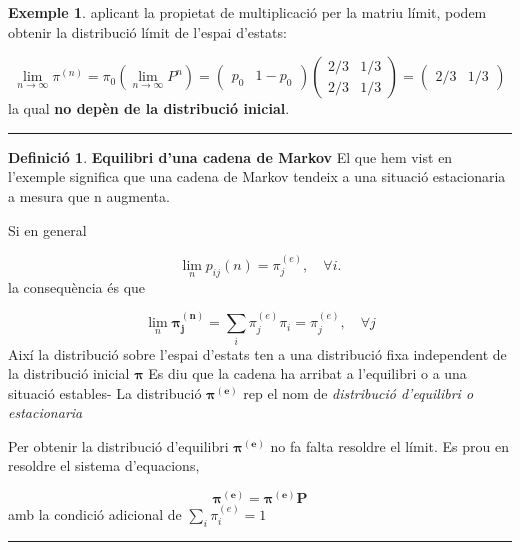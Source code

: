 \documentclass[
  catalan,
]{article}
\theoremstyle{definition}
\newtheorem{definition}{Definició}[section]
\theoremstyle{definition}
\newtheorem{example}{Exemple}[section]
\theoremstyle{definition}
\theoremstyle{definition}
\theoremstyle{remark}
\begin{document}
\begin{example}
aplicant la propietat de multiplicació per la matriu límit, podem obtenir la distribució límit de l'espai d'estats:

\[\lim_{n \to \infty} \pi^{(n)} = \pi_0 \left( \lim_{n \to \infty} P^n \right) = \begin{pmatrix} p_0 & 1 - p_0 \end{pmatrix} \begin{pmatrix} 2/3 & 1/3 \\ 2/3 & 1/3 \end{pmatrix} = \begin{pmatrix} 2/3 & 1/3 \end{pmatrix}\]
la qual \textbf{no depèn de la distribució inicial}.
\end{example}

\begin{center}\rule{0.5\linewidth}{0.5pt}\end{center}

\begin{definition}
\textbf{Equilibri d'una cadena de Markov}
El que hem vist en l'exemple significa que una cadena de Markov tendeix a una situació estacionaria a mesura que n augmenta.

Si en general

\[
\lim_n p_{ij}(n)=\pi_j^(e), \quad \forall i.
\]
la consequència és que

\[
\lim_n \boldsymbol{\pi_j^{(n)}} =\sum_i  \pi_j^(e) \pi_i=\pi_j^(e), \quad \forall j
\]
Així la distribució sobre l'espai d'estats ten a una distribució fixa independent de la distribució inicial \(\boldsymbol{\pi}\) Es diu que la cadena ha arribat a l'equilibri o a una situació estables- La distribució \(\boldsymbol{\pi^{(e)}}\) rep el nom de \emph{distribució d'equilibri o estacionaria}

Per obtenir la distribució d'equilibri \(\boldsymbol{\pi^{(e)}}\) no fa falta resoldre el límit. Es prou en resoldre el sistema d'equacions,

\[
\boldsymbol{\pi^{(e)}}=\boldsymbol{\pi^{(e)}} \boldsymbol{P}   \label{eq:pie} 
\]
amb la condició adicional de \(\sum_i \pi_i^{(e)}=1\)
\end{definition}

\begin{center}\rule{0.5\linewidth}{0.5pt}\end{center}
\end{document}
